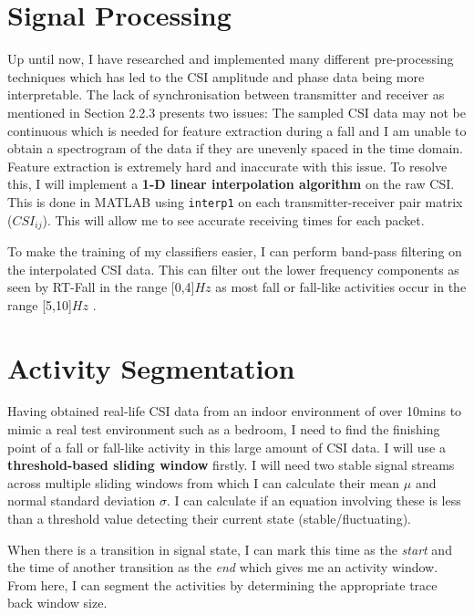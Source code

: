 \section{Signal Processing}
Up until now, I have researched and implemented many different pre-processing techniques which has led to the CSI amplitude and phase data being more interpretable. The lack of synchronisation between transmitter and receiver as mentioned in Section 2.2.3 presents two issues: The sampled CSI data may not be continuous which is needed for feature extraction during a fall and I am unable to obtain a spectrogram of the data if they are unevenly spaced in the time domain. Feature extraction is extremely hard and inaccurate with this issue. To resolve this, I will implement a \textbf{1-D linear interpolation algorithm} on the raw CSI. This is done in MATLAB using \lstinline{interp1} on each transmitter-receiver pair matrix ($CSI_{ij}$). This will allow me to see accurate receiving times for each packet.\par
To make the training of my classifiers easier, I can perform band-pass filtering on the interpolated CSI data. This can filter out the lower frequency components as seen by RT-Fall in the range [0,4]$Hz$ as most fall or fall-like activities occur in the range [5,10]$Hz$ \citep{RTFall}.
\section{Activity Segmentation}
Having obtained real-life CSI data from an indoor environment of over 10mins to mimic a real test environment such as a bedroom, I need to find the finishing point of a fall or fall-like activity in this large amount of CSI data. I will use a \textbf{threshold-based sliding window} firstly. I will need two stable signal streams across multiple sliding windows from which I can calculate their mean $\mu$ and normal standard deviation $\sigma$. I can calculate if an equation involving these is less than a threshold value detecting their current state (stable/fluctuating).\par
When there is a transition in signal state, I can mark this time as the \textit{start} and the time of another transition as the \textit{end} which gives me an activity window. From here, I can segment the activities by determining the appropriate trace back window size. 
